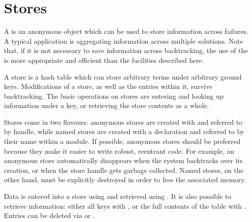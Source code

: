 \section{Stores}


A  is an anonymous object which can be used to store information
across failures.  A typical application is aggregating information across
multiple solutions.  Note that, if it is not necessary to save information
across backtracking, the use of the
is more appropriate and efficient than the facilities described here.

A store is a hash table which can store arbitrary terms under arbitrary
ground keys. Modifications of a store, as well as the entries within it,
survive backtracking.  The basic operations on stores are entering and
looking up information under a key, or retrieving the store contents as
a whole.

Stores come in two flavours:  anonymous stores are created with
and referred to by handle, while named stores are created with a
declaration and referred to by their name within a module.
If possible, anonymous stores should be preferred because they make it
easier to write robust, reentrant code.  For example, an anonymous store
automatically disappears when the system backtracks over its creation,
or when the store handle gets garbage collected.  Named stores, on the
other hand, must be explicitly destroyed in order to free the
associated memory.

Data is entered into a store using
and retrieved using
.
It is also possible to retrieve information: either all keys with
,
or the full contents of the table with
.
Entries can be deleted via
 or
.

